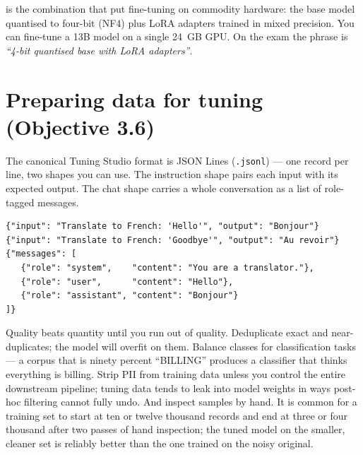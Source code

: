  is the combination that put fine-tuning on commodity hardware: the base model quantised to four-bit (NF4) plus LoRA adapters trained in mixed precision. You can fine-tune a 13B model on a single 24~GB GPU. On the exam the phrase is \emph{``4-bit quantised base with LoRA adapters''}.


\section{Preparing data for tuning (Objective 3.6)}

The canonical Tuning Studio format is JSON Lines (\texttt{.jsonl}) --- one record per line, two shapes you can use. The instruction shape pairs each input with its expected output. The chat shape carries a whole conversation as a list of role-tagged messages.

\begin{examplebox}[title=\textbf{The two JSONL shapes Tuning Studio accepts}]
\begin{lstlisting}
{"input": "Translate to French: 'Hello'", "output": "Bonjour"}
{"input": "Translate to French: 'Goodbye'", "output": "Au revoir"}
{"messages": [
   {"role": "system",    "content": "You are a translator."},
   {"role": "user",      "content": "Hello"},
   {"role": "assistant", "content": "Bonjour"}
]}
\end{lstlisting}
\end{examplebox}

Quality beats quantity until you run out of quality. Deduplicate exact and near-duplicates; the model will overfit on them. Balance classes for classification tasks --- a corpus that is ninety percent ``BILLING'' produces a classifier that thinks everything is billing. Strip PII from training data unless you control the entire downstream pipeline; tuning data tends to leak into model weights in ways post-hoc filtering cannot fully undo. And inspect samples by hand. It is common for a training set to start at ten or twelve thousand records and end at three or four thousand after two passes of hand inspection; the tuned model on the smaller, cleaner set is reliably better than the one trained on the noisy original.

